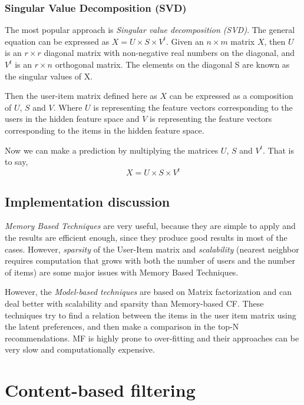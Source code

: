 \documentclass[conference]{IEEEtran}
\begin{document}
 \subsubsection{Singular Value Decomposition (SVD)}
 The most popular approach is \textit{Singular value decomposition (SVD)}. The general equation can be expressed as $X = U\times S \times V^t$. Given an $n \times m$ matrix $X$, then $U$ is an $r \times r$ diagonal matrix with non-negative real numbers on the diagonal, and $V^t$ is an $r \times n$ orthogonal matrix. The elements on the diagonal S are known as the singular values of X.
 
 Then the user-item matrix defined here as $X$ can be expressed as a composition of $U$, $S$ and $V$. Where $U$ is representing the feature vectors corresponding to the users in the hidden feature space and $V$ is representing the feature vectors corresponding to the items in the hidden feature space.
 
 Now we can make a prediction by multiplying the matrices $U$, $S$ and $V^t$. That is
to say,$$X = U \times S \times V^t$$

\subsection{Implementation discussion}
\textit{Memory Based Techniques} are very useful, because they are simple to apply and the results are efficient enough, since they produce good results in most of the cases. However, \textit{sparsity} of the User-Item matrix and \textit{scalability} (nearest neighbor requires computation that grows with both the number of users and the number of items) are some major issues with Memory Based Techniques.

However, the \textit{Model-based techniques} are based on Matrix factorization and can deal better with scalability and sparsity than Memory-based CF. These techniques try to find a relation between the items in the user item matrix using the latent preferences, and then make a comparison in the top-N recommendations. MF is highly prone to over-fitting and their approaches can be very slow and computationally expensive.

\section{Content-based filtering}

\end{document}
